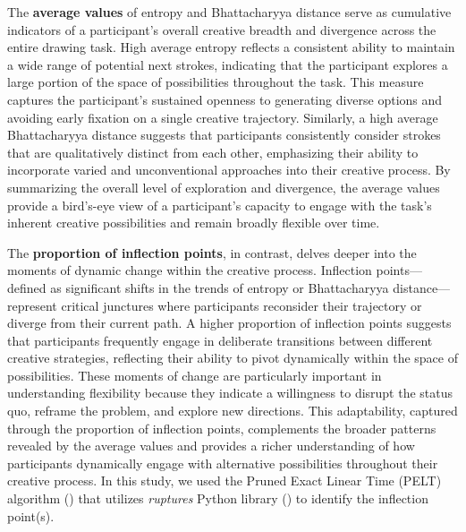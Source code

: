 \documentclass[../MA_Thesis.tex]{subfiles}
\begin{document}
The \textbf{average values} of entropy and Bhattacharyya distance serve as cumulative indicators of a participant’s overall creative breadth and divergence across the entire drawing task. High average entropy reflects a consistent ability to maintain a wide range of potential next strokes, indicating that the participant explores a large portion of the space of possibilities throughout the task. This measure captures the participant’s sustained openness to generating diverse options and avoiding early fixation on a single creative trajectory. Similarly, a high average Bhattacharyya distance suggests that participants consistently consider strokes that are qualitatively distinct from each other, emphasizing their ability to incorporate varied and unconventional approaches into their creative process. By summarizing the overall level of exploration and divergence, the average values provide a bird’s-eye view of a participant’s capacity to engage with the task’s inherent creative possibilities and remain broadly flexible over time.

The \textbf{proportion of inflection points}, in contrast, delves deeper into the moments of dynamic change within the creative process. Inflection points—defined as significant shifts in the trends of entropy or Bhattacharyya distance—represent critical junctures where participants reconsider their trajectory or diverge from their current path. A higher proportion of inflection points suggests that participants frequently engage in deliberate transitions between different creative strategies, reflecting their ability to pivot dynamically within the space of possibilities. These moments of change are particularly important in understanding flexibility because they indicate a willingness to disrupt the status quo, reframe the problem, and explore new directions. This adaptability, captured through the proportion of inflection points, complements the broader patterns revealed by the average values and provides a richer understanding of how participants dynamically engage with alternative possibilities throughout their creative process. In this study, we used the Pruned Exact Linear Time (PELT) algorithm (\cite{dorcas_wambui_power_2015}) that utilizes \textit{ruptures} Python library (\cite{truong_selective_2020}) to identify the inflection point(s).
\end{document}
